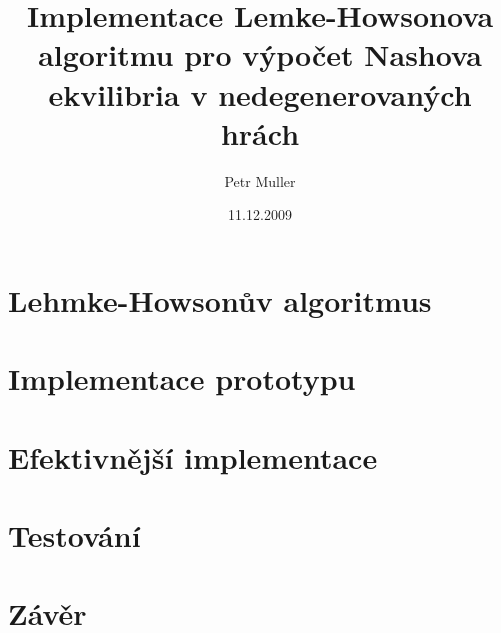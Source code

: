 \documentclass[a4paper, 12pt]{article}
\title{Implementace Lemke-Howsonova algoritmu pro výpočet Nashova ekvilibria v nedegenerovaných hrách}
\author{Petr Muller}
\date{11.12.2009}
\begin{document}
\maketitle
\section{Lehmke-Howsonův algoritmus}
\section{Implementace prototypu}
\section{Efektivnější implementace}
\section{Testování}
\section{Závěr}
\end{document}

